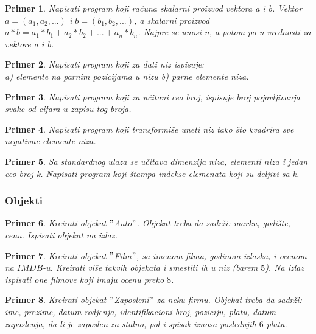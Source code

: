 \documentclass[a4paper]{article}
\newtheorem{primer}{Primer}[section]
\begin{document}
\begin{primer}
Napisati program koji računa skalarni proizvod vektora a i b. Vektor $a=(a_1, a_2,...)$ i $b=(b_1, b_2,...)$, a skalarni proizvod $a*b= a_1 * b_1 + a_2 * b_2 + ... + a_n * b_n$. Najpre se unosi n, a potom po n vrednosti za vektore a i b. 
\end{primer}

\begin{primer}
Napisati program koji za dati niz ispisuje:\\
a) elemente na parnim pozicijama u nizu
b) parne elemente niza.
\end{primer}

\begin{primer}
Napisati program koji za učitani ceo broj, ispisuje broj
pojavljivanja svake od cifara u zapisu tog broja.
\end{primer}


\begin{primer}
Napisati program koji transformiše uneti niz tako što
kvadrira sve negativne elemente niza. 
\end{primer}

\begin{primer}
Sa standardnog ulaza se učitava dimenzija niza, elementi
niza i jedan ceo broj k. Napisati program koji štampa indekse elemenata koji su
deljivi sa k.
\end{primer}

\subsubsection{Objekti}
\begin{primer}
Kreirati objekat $"$Auto$"$. Objekat treba da sadrži: marku, godište, cenu.
Ispisati objekat na izlaz.
\end{primer}

\begin{primer}
Kreirati objekat $"$Film$"$, sa imenom filma, godinom izlaska, i ocenom na $IMDB$-u. Kreirati više takvih objekata i smestiti ih u niz (barem $5$). Na izlaz ispisati one filmove koji imaju ocenu preko $8$.  
\end{primer}

\begin{primer}
Kreirati objekat $"$Zaposleni$"$ za neku firmu. Objekat treba da sadrži: ime, prezime, datum rodjenja, identifikacioni broj, poziciju, platu, datum zaposlenja, da li je zaposlen za stalno, pol i spisak iznosa poslednjih $6$ plata.
\end{primer}
\end{document}

